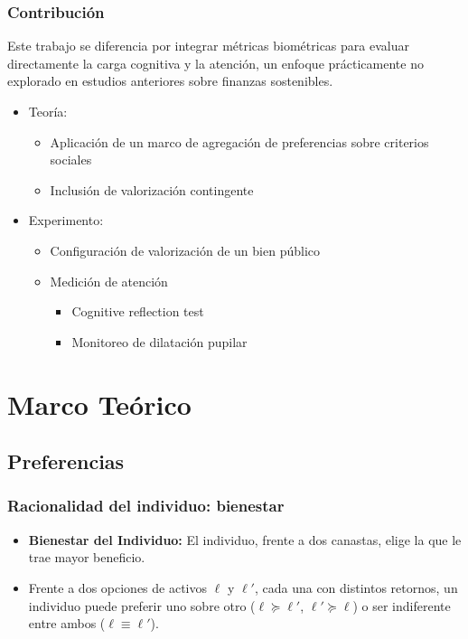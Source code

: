 \documentclass{beamer}
\begin{document}
\begin{frame}
    \frametitle{Contribución}

     Este trabajo se diferencia por integrar métricas biométricas para evaluar directamente la carga cognitiva y la atención, un enfoque prácticamente no explorado en estudios anteriores sobre finanzas sostenibles.

\begin{itemize}
    \item Teoría: 
    \begin{itemize}
        \item Aplicación de un marco de agregación de preferencias sobre criterios sociales \cite{decancq_chapter_2015,burone_measuring_2023}
        \item Inclusión de valorización contingente \cite{cooper_one-and-one-half-bound_2002}
    \end{itemize}
    \item Experimento:
    \begin{itemize}
        \item Configuración de valorización de un bien público \cite{chan_cost-effective_2024}
        \item Medición de atención
        \begin{itemize}
            \item Cognitive reflection test \cite{frederick_cognitive_2005,sirota_effect_2018}
        \item Monitoreo de dilatación pupilar \cite{geller_gazer_2020}
        \end{itemize}        
    \end{itemize}
\end{itemize}
\end{frame}


\section{Marco Teórico}
\subsection{Preferencias}
\begin{frame}
    \frametitle{Racionalidad del individuo: bienestar}
    \begin{itemize}
        \item \textbf{Bienestar del Individuo:} El individuo, frente a dos canastas, elige la que le trae mayor beneficio.
        \item Frente a dos opciones de activos $\ell$ y $\ell'$, cada una con distintos retornos, un individuo puede preferir uno sobre otro ($\ell \succeq \ell'$, $\ell' \succeq \ell$) o ser indiferente entre ambos ($\ell \equiv \ell'$).
\end{itemize}
\end{frame}
\end{document}
